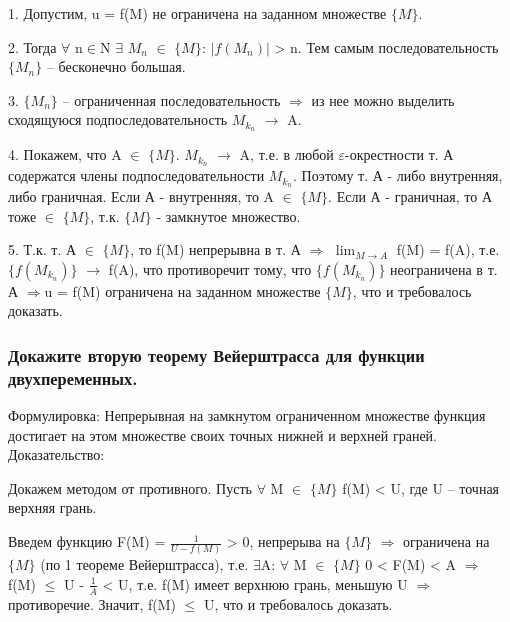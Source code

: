\documentclass[a4paper, 12pt]{article}
\renewcommand{\epsilon}{\varepsilon}
\def\newline{}%
\begin{document}
            1. Допустим, u = f(M) не ограничена на заданном множестве $\{M\}$.

            2. Тогда $\forall$ n$\in$N $\exists$ $M_n$ $\in$ $\{M\}$: $|f(M_n)|$ > n.
            Тем самым последовательность $\{M_n\}$ -- бесконечно большая.

            3. $\{M_n\}$ -- ограниченная последовательность $\Rightarrow$ из нее можно
            выделить сходящуюся подпоследовательность $M_{k_n}$ $\rightarrow$ A.

            4. Покажем, что A $\in$ $\{M\}$. $M_{k_n}$ $\rightarrow$ A, т.е. в любой
            $\epsilon$-окрестности т. А содержатся члены подпоследовательности $M_{k_n}$.
            Поэтому т. А - либо внутренняя, либо граничная.\newline
            Если А - внутренняя, то A $\in$ $\{M\}$.\newline
            Если А - граничная, то А тоже $\in$ $\{M\}$, т.к. $\{M\}$ - замкнутое
            множество.

            5. Т.к. т. А $\in$ $\{M\}$, то f(M) непрерывна в т. А $\Rightarrow$
            $\displaystyle{\lim_{M \rightarrow A}}$ f(M) = f(A), т.е.\newline
            $\{f(M_{k_n})\}$ $\rightarrow$ f(A), что противоречит тому, что
            $\{f(M_{k_n})\}$ неограничена в т. А $\Rightarrow$\newline u = f(M)
            ограничена на заданном множестве $\{M\}$, что и требовалось доказать.

            

            \subsubsection{Докажите вторую теорему Вейерштрасса для функции двух\newline переменных.}

            Формулировка: Непрерывная на замкнутом ограниченном множестве функция\newline
            достигает на этом множестве своих точных нижней и верхней граней.\newline
            Доказательство:

            Докажем методом от противного. Пусть $\forall$ M $\in$ $\{M\}$
            f(M) < U, где U -- точная верхняя грань.

            Введем функцию F(M) = $\frac{1}{U - f(M)}$ > 0, непрерыва на $\{M\}$
            $\Rightarrow$ ограничена на $\{M\}$ (по 1 теореме Вейерштрасса),
            т.е. $\exists$A: $\forall$ M $\in$ $\{M\}$ 0 < F(M) < A $\Rightarrow$
            f(M) $\leq$ U - $\frac{1}{A}$ < U, т.е. f(M) имеет верхнюю грань,
            меньшую U $\Rightarrow$ противоречие. Значит, f(M) $\leq$ U, что и
            требовалось доказать.
\end{document}
